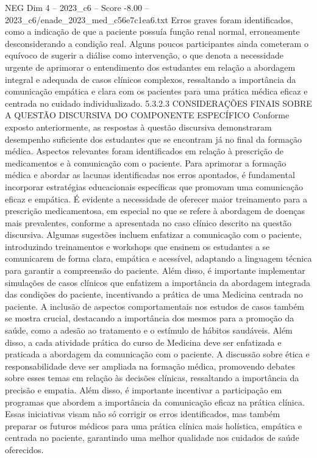 \begin{textsample}{NEG Dim 4 – 2023\_c6 – Score -8.00 – 2023\_c6/enade\_2023\_med\_c56e7c1ea6.txt}
Erros graves foram identificados, como a indicação de que a paciente possuía função renal normal, erroneamente desconsiderando a condição real.
Alguns poucos participantes ainda cometeram o equívoco de sugerir a diálise como intervenção, o que denota a necessidade urgente de aprimorar o entendimento dos estudantes em relação a abordagem integral e adequada de casos clínicos complexos, ressaltando a importância da comunicação empática e clara com os pacientes para uma prática médica eficaz e centrada no cuidado individualizado. 5.3.2.3 CONSIDERAÇÕES FINAIS SOBRE A QUESTÃO DISCURSIVA DO COMPONENTE ESPECÍFICO Conforme exposto anteriormente, as respostas à questão discursiva demonstraram desempenho suficiente dos estudantes que se encontram já no final da formação médica.
Aspectos relevantes foram identificados em relação à prescrição de medicamentos e à comunicação com o paciente.
Para aprimorar a formação médica e abordar as lacunas identificadas nos erros apontados, é fundamental incorporar estratégias educacionais específicas que promovam uma comunicação eficaz e empática.
É evidente a necessidade de oferecer maior treinamento para a prescrição medicamentosa, em especial no que se refere à abordagem de doenças mais prevalentes, conforme a apresentada no caso clínico descrito na questão discursiva.
Algumas sugestões incluem enfatizar a comunicação com o paciente, introduzindo treinamentos e workshops que ensinem os estudantes a se comunicarem de forma clara, empática e acessível, adaptando a linguagem técnica para garantir a compreensão do paciente.
Além disso, é importante implementar simulações de casos clínicos que enfatizem a importância da abordagem integrada das condições do paciente, incentivando a prática de uma Medicina centrada no paciente.
A inclusão de aspectos comportamentais nos estudos de casos também se mostra crucial, destacando a importância dos mesmos para a promoção da saúde, como a adesão ao tratamento e o estímulo de hábitos saudáveis.
Além disso, a cada atividade prática do curso de Medicina deve ser enfatizada e praticada a abordagem da comunicação com o paciente.
A discussão sobre ética e responsabilidade deve ser ampliada na formação médica, promovendo debates sobre esses temas em relação às decisões clínicas, ressaltando a importância da precisão e empatia.
Além disso, é importante incentivar a participação em programas que abordem a importância da comunicação eficaz na prática clínica.
Essas iniciativas visam não só corrigir os erros identificados, mas também preparar os futuros médicos para uma prática clínica mais holística, empática e centrada no paciente, garantindo uma melhor qualidade nos cuidados de saúde oferecidos.

\end{textsample}
